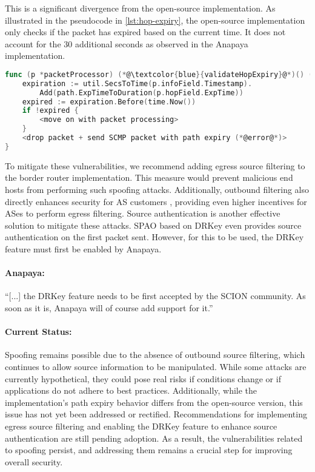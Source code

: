 This is a significant divergence from the open-source implementation.
As illustrated in the pseudocode in \cref{lst:hop-expiry}, the open-source implementation only checks if the packet has expired based on the current time.
It does not account for the 30 additional seconds as observed in the Anapaya implementation.



\begin{lstlisting}[language={Go}, morekeywords={}, caption={Pseudocode of hop expiry check in open-source implementation of the border router.}, label={lst:hop-expiry}]
func (p *packetProcessor) (*@\textcolor{blue}{validateHopExpiry}@*)() (processResult, error) {
    expiration := util.SecsToTime(p.infoField.Timestamp).
        Add(path.ExpTimeToDuration(p.hopField.ExpTime))
    expired := expiration.Before(time.Now())
    if !expired {
        <move on with packet processing>
    }
    <drop packet + send SCMP packet with path expiry (*@error@*)>
}
\end{lstlisting}


To mitigate these vulnerabilities, we recommend adding egress source filtering to the border router implementation.
This measure would prevent malicious end hosts from performing such spoofing attacks.
Additionally, outbound filtering also directly enhances security for AS customers \cite[Section 7.7.3]{Perrig2022}, providing even higher incentives for ASes to perform egress filtering.
Source authentication is another effective solution to mitigate these attacks.
SPAO based on DRKey even provides source authentication on the first packet sent.
However, for this to be used, the DRKey feature must first be enabled by Anapaya.

\begin{boxH}
    \paragraph{Anapaya:}
    ``[...] the DRKey feature needs to be first accepted by the SCION community. As soon as it is, Anapaya will of course add support for it.''
\end{boxH}


\paragraph{Current Status:}
Spoofing remains possible due to the absence of outbound source filtering, which continues to allow source information to be manipulated.
While some attacks are currently hypothetical, they could pose real risks if conditions change or if applications do not adhere to best practices.
Additionally, while the implementation's path expiry behavior differs from the open-source version, this issue has not yet been addressed or rectified.
Recommendations for implementing egress source filtering and enabling the DRKey feature to enhance source authentication are still pending adoption.
As a result, the vulnerabilities related to spoofing persist, and addressing them remains a crucial step for improving overall security.


